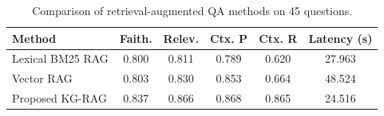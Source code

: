 \begin{table}[H]
\caption{Comparison of retrieval-augmented QA methods on 45 questions.}
\label{tab:baselinecomparison}
\centering
\begin{tabular*}{\textwidth}{@{\extracolsep{\fill}}lccccc@{}}
\toprule
\textbf{Method} & \textbf{Faith.} & \textbf{Relev.} & \textbf{Ctx. P} & \textbf{Ctx. R} & \textbf{Latency (s)} \\
\midrule
Lexical BM25 RAG & 0.800 & 0.811 & 0.789 & 0.620 & 27.963 \\
Vector RAG & 0.803 & 0.830 & 0.853 & 0.664 & 48.524 \\
Proposed KG-RAG & 0.837 & 0.866 & 0.868 & 0.865 & 24.516 \\
\bottomrule
\end{tabular*}
\end{table}